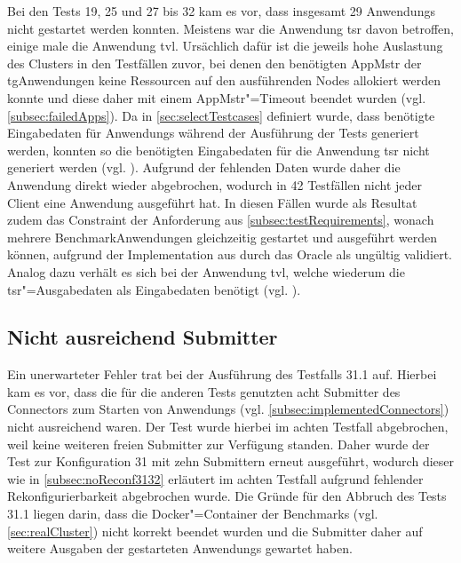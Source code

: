 Bei den \glspl{Test} 19, 25 und 27 bis 32 kam es vor, dass insgesamt 29 \glspl{Anwendung} nicht gestartet werden konnten.
Meistens war die \gls{Anwendung} \acrlong{tsr} davon betroffen, einige male die \gls{Anwendung} \acrlong{tvl}.
Ursächlich dafür ist die jeweils hohe Auslastung des Clusters in den Testfällen zuvor, bei denen den benötigten \gls{AppMstr} der \acrlong{tg}\gls{Anwendung}en keine Ressourcen auf den ausführenden Nodes allokiert werden konnte und diese daher mit einem \gls{AppMstr}"=Timeout beendet wurden (vgl. \cref{subsec:failedApps}).
Da in \cref{sec:selectTestcases} definiert wurde, dass benötigte Eingabedaten für \glspl{Anwendung} während der Ausführung der \glspl{Test} generiert werden, konnten so die benötigten Eingabedaten für die \gls{Anwendung} \acrlong{tsr} nicht generiert werden (vgl. ).
Aufgrund der fehlenden Daten wurde daher die \gls{Anwendung} direkt wieder abgebrochen, wodurch in 42 Testfällen nicht jeder Client eine \gls{Anwendung} ausgeführt hat.
In diesen Fällen wurde als Resultat zudem das Constraint der Anforderung aus \cref{subsec:testRequirements}, wonach mehrere Benchmark\gls{Anwendung}en gleichzeitig gestartet und ausgeführt werden können, aufgrund der Implementation aus  durch das Oracle als ungültig validiert.
Analog dazu verhält es sich bei der \gls{Anwendung} \acrlong{tvl}, welche wiederum die \acrlong{tsr}"=Ausgabedaten als Eingabedaten benötigt (vgl. ).

\subsection{Nicht ausreichend Submitter}
\label{subsec:notEnoughSubmitter}

Ein unerwarteter Fehler trat bei der Ausführung des Testfalls 31.1 auf.
Hierbei kam es vor, dass die für die anderen \glspl{Test} genutzten acht Submitter des Connectors zum Starten von \glspl{Anwendung} (vgl. \cref{subsec:implementedConnectors}) nicht ausreichend waren.
Der \gls{Test} wurde hierbei im achten \gls{Testfall} abgebrochen, weil keine weiteren freien Submitter zur Verfügung standen.
Daher wurde der \gls{Test} zur Konfiguration 31 mit zehn Submittern erneut ausgeführt, wodurch dieser wie in \cref{subsec:noReconf3132} erläutert im achten \gls{Testfall} aufgrund fehlender Rekonfigurierbarkeit abgebrochen wurde.
Die Gründe für den Abbruch des \glspl{Test} 31.1 liegen darin, dass die Docker"=Container der Benchmarks (vgl. \cref{sec:realCluster}) nicht korrekt beendet wurden und die Submitter daher auf weitere Ausgaben der gestarteten \glspl{Anwendung} gewartet haben.
